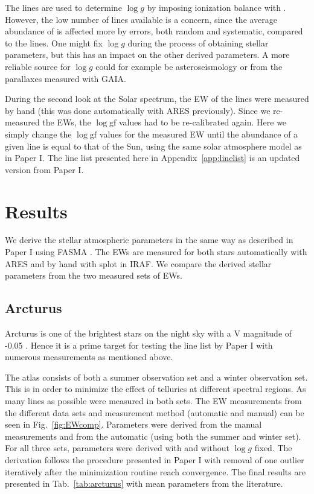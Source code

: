 \documentclass{aa}
\begin{document}
The  lines are used to determine $\log g$ by imposing ionization
balance with . However, the low number of  lines
available is a concern, since the average abundance of  is affected
more by errors, both random and systematic, compared to the  lines.
One might fix $\log g$ during the process of obtaining stellar parameters, but
this has an impact on the other derived parameters. A more reliable source for
$\log g$ could for example be asteroseismology or from the parallaxes measured
with GAIA.

During the second look at the Solar spectrum, the EW of the lines were measured
by hand (this was done automatically with ARES previously). Since we re-measured
the EWs, the $\log \mathrm{gf}$ values had to be re-calibrated again. Here we
simply change the $\log \mathrm{gf}$ values for the measured EW until the
abundance of a given line is equal to that of the Sun, using the same solar
atmosphere model as in Paper I. The line list presented here in
Appendix~\ref{app:linelist} is an updated version from Paper I.


\section{Results}
\label{sec:results}

We derive the stellar atmospheric parameters in the same way as described in
Paper I using FASMA \citep{Andreasen2017a}. The EWs are measured
for both stars automatically with ARES \citep{Sousa2015a} and by hand with splot
in IRAF. We compare the derived stellar parameters from the two measured sets of
EWs.


\subsection{Arcturus}
\label{sec:arcturus}

Arcturus is one of the brightest stars on the night sky with a V magnitude of
-0.05 \citep{Ducati2002}. Hence it is a prime target for testing the line list
by Paper I with numerous measurements as mentioned above.

The atlas consists of both a summer observation set and a winter observation
set. This is in order to minimize the effect of tellurics at different spectral
regions. As many lines as possible were measured in both sets. The EW
measurements from the different data sets and measurement method (automatic and
manual) can be seen in Fig.~\ref{fig:EWcomp}. Parameters were derived from the
manual measurements and from the automatic (using both the summer and winter
set). For all three sets, parameters were derived with and without $\log g$
fixed. The derivation follows the procedure presented in Paper I with removal of
one outlier iteratively after the minimization routine \citep{Andreasen2017a}
reach convergence. The final results are presented in Tab.~\ref{tab:arcturus}
with mean parameters from the literature.
\end{document}

